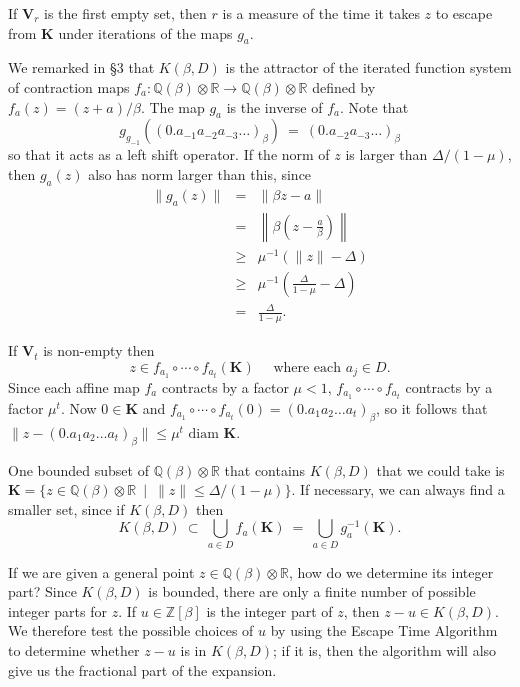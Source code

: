 \documentclass[12pt]{article}
\newcommand{\Q}{\mathbb{Q}}
\newcommand{\R}{\mathbb{R}}
\newcommand{\Z}{\mathbb{Z}}
\begin{document}
    If  $\mathbf{V}_r$ is the first empty set, then $r$ is a measure of the time it takes $z$ to escape from $\mathbf{K}$ under iterations of the maps $g_a$.

    We remarked in \S3 that $K(\beta, D)$ is the attractor of the iterated function system of contraction maps $f_a: \Q(\beta)\otimes\R\rightarrow\Q(\beta)\otimes\R$ defined by
$f_a(z)=(z+a)/\beta$. The map $g_a$ is the inverse of $f_a$. Note that
$$
g_{g_{-1}}\left((0.a_{-1}a_{-2}a_{-3}\ldots)_{\beta}\right) \ = \ (0.a_{-2}a_{-3}\ldots)_{\beta}
$$
so that it acts as a left shift operator.  If the norm of $z$ is larger than
$\Delta/(1-\mu)$, then $g_a(z)$ also has norm larger than this, since
\begin{eqnarray*} 
\|g_a(z)\| &=& \|\beta z-a\| \\
&=& \left\|\beta\left(z-\frac{a}{\beta}\right)\right\| \\
&\geqslant& \mu^{-1}(\|z\|-\Delta) \\
&\geqslant& \mu^{-1}\left(\frac{\Delta}{1-\mu}-\Delta\right) \\
&=&\frac{\Delta}{1-\mu}.
\end{eqnarray*}

If $\mathbf{V}_t$ is non-empty then
$$
z\in f_{a_1}\circ \cdots\circ f_{a_t}(\mathbf{K})\quad\mbox{ where each } a_j\in D.
$$
Since each affine map $f_a$ contracts by a factor $\mu<1$, 
$f_{a_1}\circ \cdots\circ f_{a_t}$ 
contracts by a factor $\mu^t$. 
Now $0\in \mathbf{K}$ and 
$f_{a_1}\circ \cdots\circ f_{a_t}(0)=(0.a_1a_2\ldots a_t)_{\beta}$,
so it follows that 
$\|z-(0.a_1a_2\ldots a_t)_{\beta}\|\leqslant\mu^t\mbox{ diam }\mathbf{K}$.

    One bounded subset of $\Q(\beta)\otimes\R$ that contains $K(\beta, D)$ that we could take is 
$\mathbf{K}=\{z\in\Q(\beta)\otimes\R\  \mid \ \|z\| \leqslant \Delta/(1-\mu)\}$.
If necessary, we can always
find a smaller set, since if $K(\beta, D)$ then
$$
K(\beta, D)\ \subset \ \bigcup_{a\in D} f_a(\mathbf{K}) \ = \ \bigcup_{a\in D} g_a^{-1}(\mathbf{K}).
$$

    If we are given a general point $z\in\Q(\beta)\otimes\R$, how do we determine its integer part? 
Since $K(\beta, D)$ is bounded, there are only a finite number
of possible integer parts for $z$. If $u\in\Z[\beta]$ is the integer part of $z$, then $z-u\in K(\beta, D)$. 
We therefore test the possible choices of $u$ by using the
Escape Time Algorithm to determine whether $z - u$ is in $K(\beta, D)$; if it is, then the algorithm will also give us the fractional part of the expansion.
\end{document}

